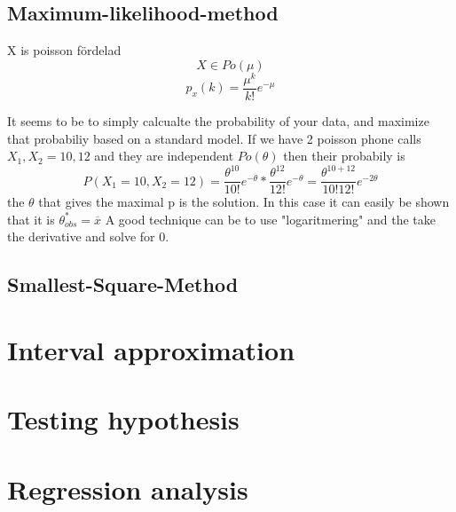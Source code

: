 \documentclass{article}
\begin{document}
    \subsection{Maximum-likelihood-method}
        X is poisson fördelad
        \[
            X \in Po(\mu)    
        \]
        \[
            p_x(k) = \frac{\mu^k}{k!}e^{-\mu}
        \]
        
        It seems to be to simply calcualte the probability of your data, and 
        maximize that probabiliy based on a standard model. If we have 2 poisson
        phone calls $X_1, X_2= 10, 12$ and they are independent $Po(\theta)$
        then their probabily is 
        \[
            P(X_1 = 10, X_2 = 12) = \frac{\theta^{10}}{10!}e^{-\theta}*\frac{\theta^{12}}{12!}e^{-\theta} = \frac{\theta^{10+12}}{10!12!}e^{-2\theta}
        \]
        the $\theta$ that gives the maximal p is the solution. In this case it can easily
        be shown that it is $\theta_{obs}^* = \overline{x}$
        A good technique can be to use "logaritmering" and the take the derivative and solve for 0.
    \subsection{Smallest-Square-Method}
        
\section{Interval approximation}
\section{Testing hypothesis}
\section{Regression analysis}
\end{document}
